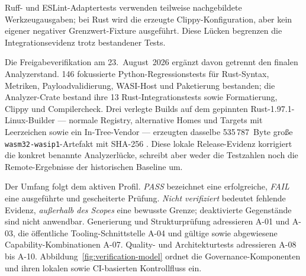 Ruff- und ESLint-Adaptertests verwenden teilweise nachgebildete
Werkzeugausgaben; bei Rust wird die erzeugte Clippy-Konfiguration, aber kein
eigener negativer Grenzwert-Fixture ausgeführt. Diese Lücken begrenzen die
Integrationsevidenz trotz bestandener Tests.

Die Freigabeverifikation am 23.~August~2026 ergänzt davon getrennt den finalen
Analyzerstand. 146 fokussierte Python-Regressionstests für Rust-Syntax,
Metriken, Payloadvalidierung, WASI-Host und Paketierung bestanden; die
Analyzer-Crate bestand ihre 13 Rust-Integrationstests sowie Formatierung,
Clippy und Compilercheck. Drei verlegte Builds auf dem gepinnten
Rust-1.97.1-Linux-Builder --- normale Registry, alternative Homes und Targets
mit Leerzeichen sowie ein In-Tree-Vendor --- erzeugten dasselbe 535\,787~Byte
große \texttt{wasm32-wasip1}-Artefakt mit SHA-256
.
Diese lokale Release-Evidenz korrigiert die konkret benannte Analyzerlücke,
schreibt aber weder die Testzahlen noch die Remote-Ergebnisse der historischen
Baseline um.

Der Umfang folgt dem aktiven Profil. \emph{PASS} bezeichnet eine erfolgreiche,
\emph{FAIL} eine ausgeführte und gescheiterte Prüfung. \emph{Nicht verifiziert}
bedeutet fehlende Evidenz, \emph{außerhalb des Scopes} eine bewusste Grenze;
deaktivierte Gegenstände sind nicht anwendbar. Generierung und Strukturprüfung
adressieren A-01 und A-03, die öffentliche Tooling-Schnittstelle A-04 und
gültige sowie abgewiesene Capability-Kombinationen A-07. Quality- und
Architekturtests adressieren A-08 bis A-10.
Abbildung~\ref{fig:verification-model} ordnet die Governance-Komponenten und
ihren lokalen sowie CI-basierten Kontrollfluss ein.


